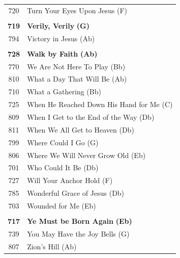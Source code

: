 \begin{small}
\begin{supertabular}{c l}
720 & Turn Your Eyes Upon Jesus (F) \\
 & \\
\textbf{719} & \textbf{Verily, Verily} \textbf{(G)} \\
794 & Victory in Jesus (Ab) \\
 & \\
\textbf{728} & \textbf{Walk by Faith} \textbf{(Ab)} \\
770 & We Are Not Here To Play (Bb) \\
810 & What a Day That Will Be (Ab) \\
710 & What a Gathering (Bb) \\
725 & When He Reached Down His Hand for Me (C) \\
809 & When I Get to the End of the Way (Db) \\
811 & When We All Get to Heaven (Db) \\
799 & Where Could I Go (G) \\
806 & Where We Will Never Grow Old (Eb) \\
701 & Who Could It Be (Db) \\
727 & Will Your Anchor Hold (F) \\
785 & Wonderful Grace of Jesus (Db) \\
703 & Wounded for Me (Eb) \\
 & \\
\textbf{717} & \textbf{Ye Must be Born Again} \textbf{(Eb)} \\
739 & You May Have the Joy Bells (G) \\
807 & Zion’s Hill (Ab) \\
\end{supertabular}
\end{small}

